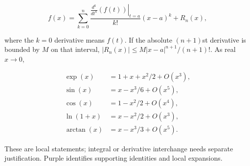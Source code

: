 \documentclass[10pt,letterpaper]{article}
\begin{document}
\begin{minipage}[t]{0.485\textwidth}
\[
f(x)=\sum_{k=0}^{n}\frac{\left.\frac{d^k}{dt^k}(f(t))\right|_{t=a}}{k!}(x-a)^k+R_n(x),
\]

where the \(k=0\) derivative means \(f(t)\). If the absolute \((n+1)\)st derivative
is bounded by \(M\) on that interval,
\(|R_n(x)|\le M|x-a|^{n+1}/(n+1)!\).
As real \(x\to0\),

\[
\begin{aligned}
\exp(x)&=1+x+x^2/2+O(x^3),\\
\sin(x)&=x-x^3/6+O(x^5),\\
\cos(x)&=1-x^2/2+O(x^4),\\
\ln(1+x)&=x-x^2/2+O(x^3),\\
\arctan(x)&=x-x^3/3+O(x^5).
\end{aligned}
\]

These are local statements; integral or derivative interchange needs separate
justification. Purple identifies supporting identities and local expansions.\endgroup
\end{minipage}
\end{document}

